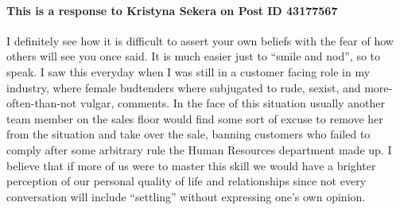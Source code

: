     \paragraph{This is a response to Kristyna Sekera on Post ID 43177567}
      I definitely see how it is difficult to assert your own beliefs with the
        fear of how others will see you once said. It is much easier just to
        ``smile and nod'', so to speak. I saw this everyday when I was still in
        a customer facing role in my industry, where female budtenders where
        subjugated to rude, sexist, and more-often-than-not vulgar, comments. In
        the face of this situation usually another team member on the sales
        floor would find some sort of excuse to remove her from the situation
        and take over the sale, banning customers who failed to comply after
        some arbitrary rule the Human Resources department made up. I believe
        that if more of us were to master this skill we would have a brighter
        perception of our personal quality of life and relationships since not
        every conversation will include ``settling'' without expressing one's
        own opinion.
